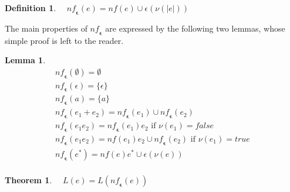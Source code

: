 \documentclass[preprint]{sigplanconf}
\newcommand{\true}{\mathit{true}}
\newcommand{\false}{\mathit{false}}
\newcommand{\nul}[1]{\ensuremath{\nu(#1)}}
\newcommand{\dnf}{\mathit{nf}}
\newcommand{\nf}{\mathit{nf}_{\!\mathbf{\epsilon}}}
\newcounter{item}
\newtheorem{theorem}[item]{Theorem}
\newtheorem{lemma}[item]{Lemma}
\newtheorem{definition}[item]{Definition}
\begin{document}
\begin{definition}
$\quad \nf(e) = \dnf(e) \cup \epsilon(\nul{|e|})$
\end{definition}
The main properties of $\nf$ are expressed by the following
two lemmas, whose simple proof is left to the reader.
\begin{lemma}\label{lemma:nf}
\[
\begin{array}{l}
\nf(\emptyset)= \emptyset\\
\nf(\epsilon)= \{\epsilon\}\\
\nf(a) = \{a\}\\
\nf(e_1+e_2) = \nf(e_1) \cup \nf(e_2)\\
\nf(e_1e_2) = \nf(e_1)e_2 \mbox{ if } \nul{e_1}=\false\\
\nf(e_1e_2) = \dnf(e_1)e_2 \cup \nf(e_2) \mbox{ if } \nul{e_1}=\true\\
\nf(e^*) = \dnf(e)e^* \cup \epsilon(\nul{e})\\
\end{array}
\]
\end{lemma}


\begin{theorem}\label{techz}
 $\quad L(e) = L(\nf(e)) $
\end{theorem}
\end{document}
